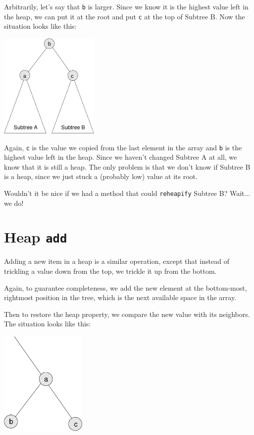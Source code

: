 \documentclass[12pt]{book}
\theoremstyle{exercise}
\begin{document}
Arbitrarily, let's say that {\tt b} is larger.  Since we
know it is the highest value left in the heap, we can put it
at the root and put {\tt c} at the top of Subtree B.  Now the
situation looks like this:
 
\includegraphics[height=2in]{figs/tree6.pdf}

Again, {\tt c} is the value we copied from the
last element in the array and {\tt b} is the highest
value left in the heap.  Since we haven't changed Subtree A
at all, we know that it is still a heap.  The only problem is
that we don't know if Subtree B is a heap, since we just stuck
a (probably low) value at its root.


Wouldn't it be nice if we had a method that could {\tt reheapify}
Subtree B?  Wait... we do!


\section {Heap {\tt add}}

Adding a new item in a heap is a similar operation, except that
instead of trickling a value down from the top, we trickle it
up from the bottom.

Again, to guarantee completeness, we add the new element at the
bottom-most, rightmost position in the tree, which is the next
available space in the array.

Then to restore the heap property, we compare the new value with
its neighbors.  The situation looks like this:
 
\includegraphics[height=2in]{figs/tree7.pdf}
 
\end{document}
